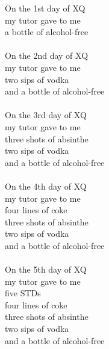 
            On the 1st day of XQ \\
            my tutor gave to me \\
            a bottle of alcohol-free \\
\hspace{10mm} \\
            On the 2nd day of XQ \\
            my tutor gave to me \\
            two sips of vodka \\
            and a bottle of alcohol-free \\
\hspace{10mm} \\
            On the 3rd day of XQ \\
            my tutor gave to me \\
            three shots of absinthe \\
            two sips of vodka \\
            and a bottle of alcohol-free \\
\hspace{10mm} \\
            On the 4th day of XQ \\
            my tutor gave to me \\
            four lines of coke \\
            three shots of absinthe \\
            two sips of vodka \\
            and a bottle of alcohol-free \\
\hspace{10mm} \\
            On the 5th day of XQ \\
            my tutor gave to me \\
            five STDs \\
            four lines of coke \\
            three shots of absinthe \\
            two sips of vodka \\
            and a bottle of alcohol-free \\
